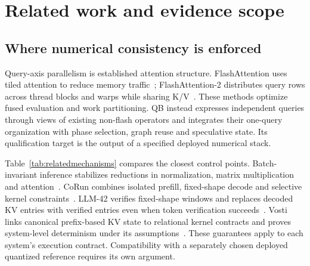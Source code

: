 \section{Related work and evidence scope}
\label{sec:related}
\subsection{Where numerical consistency is enforced}
Query-axis parallelism is established attention structure. FlashAttention uses tiled attention to reduce memory traffic~\cite{flashattention}; FlashAttention-2 distributes query rows across thread blocks and warps while sharing K/V~\cite{flashattention2}. These methods optimize fused evaluation and work partitioning. QB instead expresses independent queries through views of existing non-flash operators and integrates their one-query organization with phase selection, graph reuse and speculative state. Its qualification target is the output of a specified deployed numerical stack.

Table~\ref{tab:relatedmechanisms} compares the closest control points. Batch-invariant inference stabilizes reductions in normalization, matrix multiplication and attention~\cite{thinkingmachines}. CoRun combines isolated prefill, fixed-shape decode and selective kernel constraints~\cite{corun}. LLM-42 verifies fixed-shape windows and replaces decoded KV entries with verified entries even when token verification succeeds~\cite{llm42}. Vosti links canonical prefix-based KV state to relational kernel contracts and proves system-level determinism under its assumptions~\cite{vosti}. These guarantees apply to each system's execution contract. Compatibility with a separately chosen deployed quantized reference requires its own argument.


